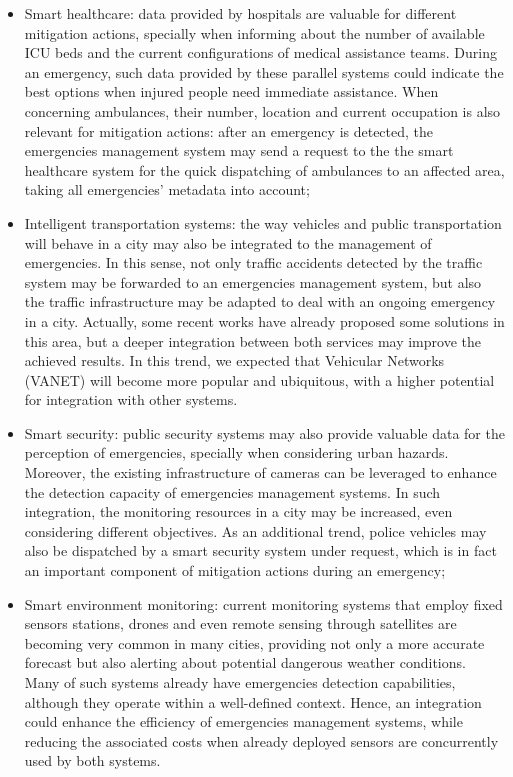 \begin{refsection}
\begin{itemize}
  \item Smart healthcare: data provided by hospitals are valuable for different mitigation actions, specially when informing about the number of available ICU beds and the current configurations of medical assistance teams. During an emergency, such data provided by these parallel systems could indicate the best options when injured people need immediate assistance. When concerning ambulances, their number, location and current occupation is also relevant for mitigation actions: after an emergency is detected, the emergencies management system may send a request to the the smart healthcare system for the quick dispatching of ambulances to an affected area, taking all emergencies' metadata into account;
  
  \item Intelligent transportation systems: the way vehicles and public transportation will behave in a city may also be integrated to the management of emergencies. In this sense, not only traffic accidents detected by the traffic system may be forwarded to an emergencies management system, but also the traffic infrastructure may be adapted to deal with an ongoing emergency in a city. Actually, some recent works have already proposed some solutions in this area, but a deeper integration between both services may improve the achieved results. In this trend, we expected that Vehicular Networks (VANET) will become more popular and ubiquitous, with a higher potential for integration with other systems.

  \item Smart security: public security systems may also provide valuable data for the perception of emergencies, specially when considering urban hazards. Moreover, the existing infrastructure of cameras can be leveraged to enhance the detection capacity of emergencies management systems. In such integration, the monitoring resources in a city may be increased, even considering different objectives. As an additional trend, police vehicles may also be dispatched by a smart security system under request, which is in fact an important component of mitigation actions during an emergency;
  
  \item Smart environment monitoring: current monitoring systems that employ fixed sensors stations, drones and even remote sensing through satellites are becoming very common in many cities, providing not only a more accurate forecast but also alerting about potential dangerous weather conditions. Many of such systems already have emergencies detection capabilities, although they operate within a well-defined context. Hence, an integration could enhance the efficiency of emergencies management systems, while reducing the associated costs when already deployed sensors are concurrently used by both systems.
\end{itemize}


\end{refsection}
